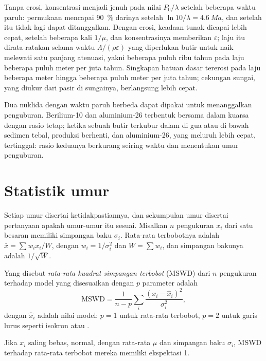 Tanpa erosi, konsentrasi menjadi jenuh pada nilai $P_0/\lambda$ setelah beberapa
waktu paruh: permukaan mencapai \qty{90}{\percent} darinya setelah $\ln 10/\lambda
= \qty{4.6}{Ma}$, dan setelah itu tidak lagi dapat ditanggalkan. Dengan erosi,
keadaan tunak dicapai lebih cepat, setelah beberapa kali $1/\mu$, dan
konsentrasinya memberikan $\varepsilon$; laju itu dirata-ratakan selama waktu
$\Lambda/(\rho\varepsilon)$ yang diperlukan butir untuk naik melewati satu
panjang atenuasi, yakni beberapa puluh ribu tahun pada laju beberapa
puluh meter per juta tahun. Singkapan batuan dasar tererosi pada laju beberapa meter
hingga beberapa puluh meter per juta tahun; cekungan sungai, yang diukur dari
pasir di sungainya, berlangsung lebih cepat.

Dua nuklida dengan waktu paruh berbeda dapat dipakai untuk menanggalkan penguburan. Berilium-10 dan
aluminium-26 terbentuk bersama dalam kuarsa dengan rasio tetap; ketika sebuah butir
terkubur dalam di gua atau di bawah sedimen tebal, produksi berhenti, dan
aluminium-26, yang meluruh lebih cepat, tertinggal: rasio keduanya
berkurang seiring waktu dan menentukan umur penguburan.

\section{Statistik umur}\label{sec:b3:advanced-geochronology:statistics}

Setiap umur disertai ketidakpastiannya, dan sekumpulan umur disertai pertanyaan
apakah umur-umur itu sesuai. Misalkan $n$ pengukuran $x_i$ dari satu besaran memiliki simpangan baku
$\sigma_i$. Rata-rata terbobotnya adalah $\bar x = \sum w_ix_i/W$, dengan
$w_i = 1/\sigma_i^2$ dan $W = \sum w_i$, dan simpangan bakunya adalah
$1/\sqrt W$.

\begin{definition}\label{def:b3:advanced-geochronology:mswd}
Yang disebut \emph{rata-rata kuadrat simpangan terbobot}
(MSWD) dari $n$ pengukuran terhadap model yang disesuaikan dengan $p$ parameter
adalah
\[
\mathrm{MSWD} = \frac{1}{n - p}\sum_i \frac{(x_i - \hat x_i)^2}{\sigma_i^2},
\]
dengan $\hat x_i$ adalah nilai model: $p = 1$ untuk rata-rata terbobot, $p = 2$ untuk
garis lurus seperti isokron atau .
\end{definition}

\begin{proposition}\label{prop:b3:advanced-geochronology:mswd}
Jika $x_i$ saling bebas, normal, dengan rata-rata $\mu$ dan simpangan baku
$\sigma_i$, MSWD terhadap rata-rata terbobot mereka memiliki ekspektasi 1.
\end{proposition}

